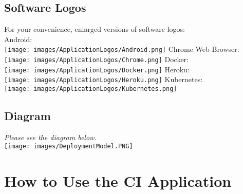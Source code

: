 \documentclass[11pt]{article}
\begin{document}
    \subsection{Software Logos}
    For your convenience, enlarged versions of software logos:\\[0.5cm]
    Android:\\[0.5cm]
    \texttt{[image: images/ApplicationLogos/Android.png]}
    \newline
    Chrome Web Browser:\\[0.5cm]
    \texttt{[image: images/ApplicationLogos/Chrome.png]}
    \newline
    Docker:\\[0.5cm]
    \texttt{[image: images/ApplicationLogos/Docker.png]}
    \newline
    Heroku:\\[0.5cm]
    \texttt{[image: images/ApplicationLogos/Heroku.png]}
    \newline
    Kubernetes:\\[0.5cm]
    \texttt{[image: images/ApplicationLogos/Kubernetes.png]}
    \newline
    \subsection{Diagram}
    \textit{Please see the diagram below.}\\[0.5cm]
    \texttt{[image: images/DeploymentModel.PNG]}
\newpage

\section{How to Use the CI Application}
\end{document}
